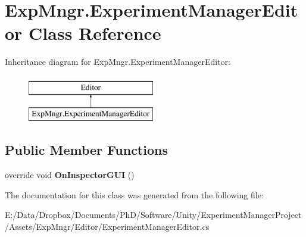 \hypertarget{class_exp_mngr_1_1_experiment_manager_editor}{}\section{Exp\+Mngr.\+Experiment\+Manager\+Editor Class Reference}
\label{class_exp_mngr_1_1_experiment_manager_editor}
Inheritance diagram for Exp\+Mngr.\+Experiment\+Manager\+Editor\+:\begin{figure}[H]
\begin{center}
\leavevmode
\includegraphics[height=2.000000cm]{class_exp_mngr_1_1_experiment_manager_editor}
\end{center}
\end{figure}
\subsection*{Public Member Functions}
\begin{DoxyCompactItemize}
\item 
\mbox{\label{class_exp_mngr_1_1_experiment_manager_editor_a9f4b5aeec16580b6aaa71922d3a89d18}} 
override void {\bfseries On\+Inspector\+G\+UI} ()
\end{DoxyCompactItemize}


The documentation for this class was generated from the following file\+:\begin{DoxyCompactItemize}
\item 
E\+:/\+Data/\+Dropbox/\+Documents/\+Ph\+D/\+Software/\+Unity/\+Experiment\+Manager\+Project/\+Assets/\+Exp\+Mngr/\+Editor/Experiment\+Manager\+Editor.\+cs\end{DoxyCompactItemize}
